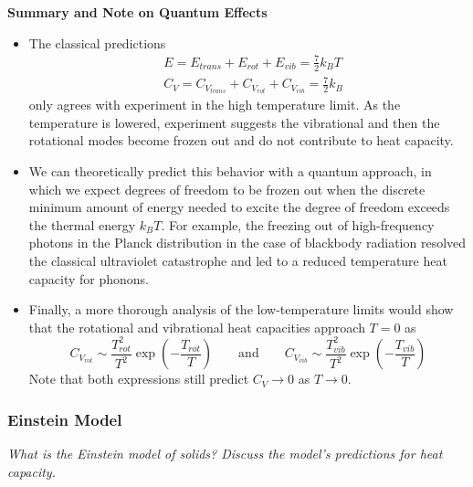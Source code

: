 \documentclass[11pt, a4paper]{article}
\newcommand{\eqtext}[1]{\qquad \text{#1} \qquad}
\begin{document}
\smallskip
\textbf{Summary and Note on Quantum Effects}
\begin{itemize}
	\item The classical predictions
	\begin{align*}
		&E = E_{trans} + E_{rot} + E_{vib} = \frac{7}{2}k_{B}T\\
		&C_{V} = C_{V_{trans}} +	C_{V_{rot}} + C_{V_{vib}} = \frac{7}{2}k_{B}
	\end{align*}
	only agrees with experiment in the high temperature limit. As the temperature is lowered, experiment suggests the vibrational and then the rotational modes become frozen out and do not contribute to heat capacity.
	
	\item We can theoretically predict this behavior with a quantum approach, in which we expect degrees of freedom to be frozen out when the discrete minimum amount of energy needed to excite the degree of freedom exceeds the thermal energy $ k_{B}T $. For example, the freezing out of high-frequency photons in the Planck distribution in the case of blackbody radiation resolved the classical ultraviolet catastrophe and led to a reduced temperature heat capacity for phonons.
	
	\item Finally, a more thorough analysis of the low-temperature limits would show that the rotational and vibrational heat capacities approach $ T = 0 $ as
	\begin{equation*}
		C_{V_{rot}} \sim \frac{T_{rot}^{2}}{T^{2}} \exp(-\frac{T_{rot}}{T}) \eqtext{and} C_{V_{vib}} \sim \frac{T_{vib}^{2}}{T^{2}} \exp(-\frac{T_{vib}}{T})
	\end{equation*}
	Note that both expressions still predict $ C_{V} \to 0 $ as $ T \to 0 $.
\end{itemize}





\subsubsection{Einstein Model} \label{sss:einstein_model}
\textit{What is the Einstein model of solids? Discuss the model's predictions for heat capacity.}
\end{document}
